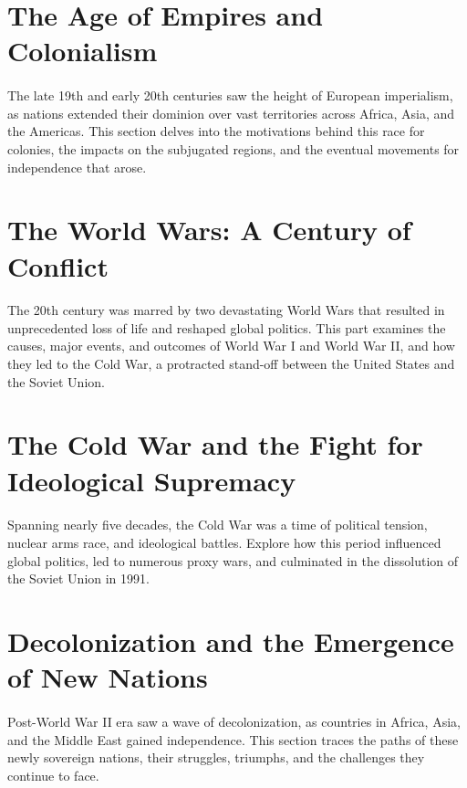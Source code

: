 \documentclass[a4paper,12pt]{book}
\begin{document}
\section*{The Age of Empires and Colonialism}
\paragraph{}
The late 19th and early 20th centuries saw the height of European imperialism, as nations extended their dominion over vast territories across Africa, Asia, and the Americas. This section delves into the motivations behind this race for colonies, the impacts on the subjugated regions, and the eventual movements for independence that arose.

\section*{The World Wars: A Century of Conflict}
\paragraph{}
The 20th century was marred by two devastating World Wars that resulted in unprecedented loss of life and reshaped global politics. This part examines the causes, major events, and outcomes of World War I and World War II, and how they led to the Cold War, a protracted stand-off between the United States and the Soviet Union.

\section*{The Cold War and the Fight for Ideological Supremacy}
\paragraph{}
Spanning nearly five decades, the Cold War was a time of political tension, nuclear arms race, and ideological battles. Explore how this period influenced global politics, led to numerous proxy wars, and culminated in the dissolution of the Soviet Union in 1991.

\section*{Decolonization and the Emergence of New Nations}
\paragraph{}
Post-World War II era saw a wave of decolonization, as countries in Africa, Asia, and the Middle East gained independence. This section traces the paths of these newly sovereign nations, their struggles, triumphs, and the challenges they continue to face.
\end{document}
